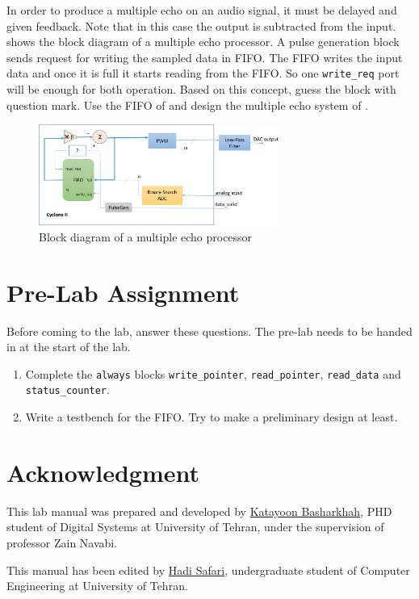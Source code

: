 \documentclass[12pt, logo=tehranDLDL/ut]{tehranDLDL}
\begin{document}
In order to produce a multiple echo on an audio signal, it must be delayed and given feedback. Note that in this case the output is subtracted from the input.
 shows the block diagram of a multiple echo processor. A pulse generation block sends request for writing the sampled data in FIFO. The FIFO writes the input data and once it is full it starts reading from the FIFO. So one \lstinline{write_req} port will be enough for both operation. Based on this concept, guess the block with question mark. Use the FIFO of  and design the multiple echo system of . 

\begin{figure}
    \centering
    \caption{Block diagram of a multiple echo processor\label{fig:multiple-echo}}
    \includegraphics[width=0.7\textwidth]{multiple-echo}
\end{figure}

\designverification{}

\section*{Pre-Lab Assignment}
Before coming to the lab, answer these questions. The pre-lab needs to be handed in at the start of the lab.

\begin{enumerate}
    \item Complete the \lstinline{always} blocks \lstinline{write_pointer}, \lstinline{read_pointer}, \lstinline{read_data} and \lstinline{status_counter}.
    \item Write a testbench for the FIFO. Try to make a preliminary design at least.
\end{enumerate}


\section*{Acknowledgment}

This lab manual was prepared and developed by \href{mailto:ktbasharkhah@gmail.com?subject=[DLDLab]\%20}{Katayoon Basharkhah}, PHD student of Digital Systems at University of Tehran, under the supervision of professor Zain Navabi.

This manual has been edited by \href{mailto:hadi.safari@ut.ac.ir?subject=[DLDLab]\%20}{Hadi Safari}, undergraduate student of Computer Engineering at University of Tehran.
\end{document}

